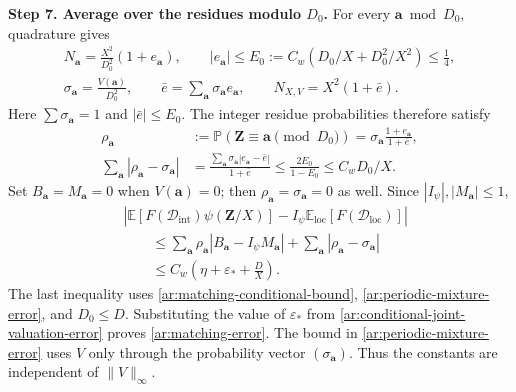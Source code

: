 \documentclass[twoside]{aomart}
\makeatletter
\theoremstyle{paperplain}
\theoremstyle{paperdefinition}
\renewenvironment{proof}[1][\proofname]{\par\pushQED{\qed}%
  \normalfont\topsep6\p@\@plus3\p@\relax\trivlist
  \item[\hskip\labelsep\itshape #1\@addpunct{.}]\ignorespaces
}{\popQED\endtrivlist\@endpefalse}
\newcommand{\E}{\mathbb E}
\newcommand{\Pp}{\mathbb P}
\numberwithin{equation}{section}
\makeatother
\begin{document}
\begin{proof}
\par
\medskip
\noindent\textbf{Step 7. Average over the residues modulo $D_0$.}
For every $\mathbf a\bmod D_0$, quadrature gives
\begin{equation*}
 \begin{gathered}
 N_{\mathbf a}=\frac{X^2}{D_0^2}(1+e_{\mathbf a}),
 \qquad |e_{\mathbf a}|\le
 E_0:=C_w(D_0/X+D_0^2/X^2)\le\frac14,\\
 \sigma_{\mathbf a}=\frac{V(\mathbf a)}{D_0^2},
 \qquad \bar e=\sum_{\mathbf a}\sigma_{\mathbf a}e_{\mathbf a},
 \qquad N_{X,V}=X^2(1+\bar e).
 \end{gathered}
 \end{equation*}
Here $\sum\sigma_{\mathbf a}=1$ and $|\bar e|\le E_0$.
The integer residue probabilities therefore satisfy
\begin{equation}
 \begin{aligned}
 \rho_{\mathbf a}
 &:=\Pp(\mathbf Z\equiv\mathbf a\pmod{D_0})
   =\sigma_{\mathbf a}\frac{1+e_{\mathbf a}}{1+\bar e},\\
 \sum_{\mathbf a}|\rho_{\mathbf a}-\sigma_{\mathbf a}|
 &=\frac{\sum_{\mathbf a}\sigma_{\mathbf a}|e_{\mathbf a}-\bar e|}
         {1+\bar e}
 \le\frac{2E_0}{1-E_0}\le C_wD_0/X.
 \end{aligned}
 \label{ar:periodic-mixture-error}
\end{equation}
Set $B_{\mathbf a}=M_{\mathbf a}=0$ when $V(\mathbf a)=0$;
then $\rho_{\mathbf a}=\sigma_{\mathbf a}=0$ as well.
Since $|I_\psi|,|M_{\mathbf a}|\le1$,
\begin{equation*}
 \begin{aligned}
 &\left|\E[F(\mathcal D_{\mathrm{int}})\psi(\mathbf Z/X)]
       -I_\psi\E_{\mathrm{loc}}[F(\mathcal D_{\mathrm{loc}})]\right|\\
 &\qquad\le\sum_{\mathbf a}\rho_{\mathbf a}
          |B_{\mathbf a}-I_\psi M_{\mathbf a}|
       +\sum_{\mathbf a}|\rho_{\mathbf a}-\sigma_{\mathbf a}|\\
 &\qquad\le C_w\left(\eta+\varepsilon_*+\frac DX\right).
 \end{aligned}
 \end{equation*}
The last inequality uses \eqref{ar:matching-conditional-bound},
\eqref{ar:periodic-mixture-error}, and $D_0\le D$.
Substituting the value of $\varepsilon_*$ from
\eqref{ar:conditional-joint-valuation-error} proves \eqref{ar:matching-error}.
The bound in \eqref{ar:periodic-mixture-error} uses $V$ only through
the probability vector $(\sigma_{\mathbf a})$.
Thus the constants are independent of $\|V\|_\infty$.
\end{proof}
\end{document}
